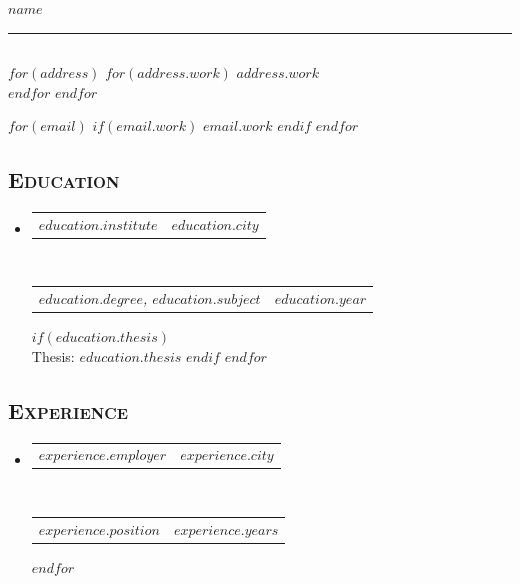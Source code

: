 \documentclass[11pt, letterpaper]{scrartcl}
\makeatletter
\newcommand{\headerrow}[2]
{\begin{tabular*}{\linewidth}{l@{\extracolsep{\fill}}r}
	#1 &
	#2 \\
\end{tabular*}}
\makeatother
\begin{document}
{\noindent\Large\textbf{$name$}}\\
\hrule

\subsection*{}
$for(address)$
$for(address.work)$
$address.work$\\
$endfor$
$endfor$

$for(email)$
$if(email.work)$
\href{mailto:$email.work$}{$email.work$}
$endif$
$endfor$

%	

\subsection*{\textsc{Education}}
\begin{itemize}
	\parskip=0.1em
    
    $for(education)$
	\item 
	\headerrow
		{\textbf{$education.institute$}}
		{\textbf{$education.city$}}
	\\
	\headerrow
		{\emph{$education.degree$, $education.subject$}}
		{\emph{$education.year$}}
        $if(education.thesis)$
            \\
            {Thesis: {$education.thesis$}}
        $endif$
	$endfor$
\end{itemize}


\subsection*{\textsc{Experience}}
\begin{itemize}
	\parskip=0.1em
	
	$for(experience)$
	\item
	\headerrow
	{\textbf{$experience.employer$}}
	{\textbf{$experience.city$}}
	\\
	\headerrow
	{\emph{$experience.position$}}
	{\emph{$experience.years$}}
	$endfor$
\end{itemize}
\end{document}
